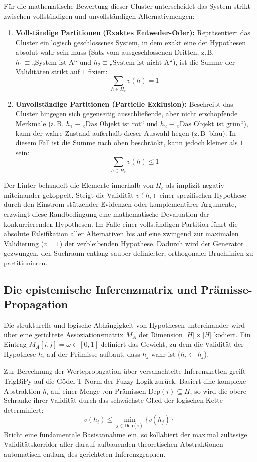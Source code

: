 \documentclass[11pt, a4paper]{article}
\begin{document}
	Für die mathematische Bewertung dieser Cluster unterscheidet das System strikt zwischen vollständigen und unvollständigen Alternativmengen:
	
	\begin{enumerate}
		\item \textbf{Vollständige Partitionen (Exaktes Entweder-Oder):} Repräsentiert das Cluster ein logisch geschlossenes System, in dem exakt eine der Hypothesen absolut wahr sein muss (Satz vom ausgeschlossenen Dritten, z.\,B. $h_1 \equiv \text{„System ist A“}$ und $h_2 \equiv \text{„System ist nicht A“}$), ist die Summe der Validitäten strikt auf $1$ fixiert:
		\[
		\sum_{h \in H_c} v(h) = 1
		\]
		
		\item \textbf{Unvollständige Partitionen (Partielle Exklusion):} Beschreibt das Cluster hingegen sich gegenseitig ausschließende, aber nicht erschöpfende Merkmale (z.\,B. $h_1 \equiv \text{„Das Objekt ist rot“}$ und $h_2 \equiv \text{„Das Objekt ist grün“}$), kann der wahre Zustand außerhalb dieser Auswahl liegen (z.\,B. blau). In diesem Fall ist die Summe nach oben beschränkt, kann jedoch kleiner als $1$ sein:
		\[
		\sum_{h \in H_c} v(h) \le 1
		\]
	\end{enumerate}
	
	Der Linter behandelt die Elemente innerhalb von $H_c$ als implizit negativ miteinander gekoppelt. Steigt die Validität $v(h_i)$ einer spezifischen Hypothese durch den Einstrom stützender Evidenzen oder komplementärer Argumente, erzwingt diese Randbedingung eine mathematische Devaluation der konkurrierenden Hypothesen. Im Falle einer vollständigen Partition führt die absolute Falsifikation aller Alternativen bis auf eine zwingend zur maximalen Validierung ($v=1$) der verbleibenden Hypothese. Dadurch wird der Generator gezwungen, den Suchraum entlang sauber definierter, orthogonaler Bruchlinien zu partitionieren.
	
	\subsection{Die epistemische Inferenzmatrix und Prämisse-Propagation}
	Die strukturelle und logische Abhängigkeit von Hypothesen untereinander wird über eine gerichtete Assoziationsmatrix $M_A$ der Dimension $|H| \times |H|$ kodiert. Ein Eintrag $M_A[i, j] = \omega \in [0, 1]$ definiert das Gewicht, zu dem die Validität der Hypothese $h_i$ auf der Prämisse aufbaut, dass $h_j$ wahr ist ($h_i \leftarrow h_j$).
	
	Zur Berechnung der Wertepropagation über verschachtelte Inferenzketten greift TrigBiPy auf die Gödel-T-Norm der Fuzzy-Logik zurück. Basiert eine komplexe Abstraktion $h_i$ auf einer Menge von Prämissen $\text{Dep}(i) \subseteq H$, so wird die obere Schranke ihrer Validität durch das schwächste Glied der logischen Kette determiniert:
	\[
	v(h_i) \le \min_{j \in \text{Dep}(i)} \{ v(h_j) \}
	\]
	Bricht eine fundamentale Basisannahme ein, so kollabiert der maximal zulässige Validitätskorridor aller darauf aufbauenden theoretischen Abstraktionen automatisch entlang des gerichteten Inferenzgraphen.
	
\end{document}
